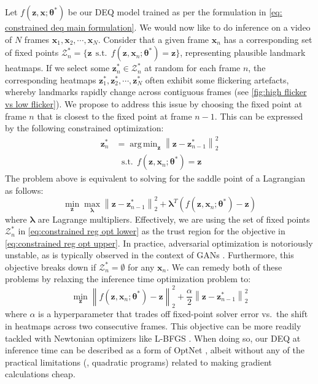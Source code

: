 \documentclass[10pt,twocolumn,letterpaper]{article}
\newcommand\norm[1]{\left\lVert#1\right\rVert}
\def\vtheta{{\bm{\theta}}}
\def\vlambda{{\bm{\lambda}}}
\def\vx{{\bm{x}}}
\def\vz{{\bm{z}}}
\DeclareMathOperator*{\argmin}{arg\,min}
\begin{document}
Let $f(\vz,\vx;\vtheta^*)$ be our DEQ model trained as per the formulation in \cref{eq: constrained deq main formulation}. We would now like to do inference on a video of $N$ frames $\vx_1, \vx_2, \cdots, \vx_N$. Consider that a given frame $\vx_n$ has a corresponding set of fixed points $\mathcal{Z}^*_n = \{ \vz ~~ \text{s.t.} ~~ f(\vz, \vx_n; \vtheta^*) = \vz \}$, representing plausible landmark heatmaps. If we select some $\vz_n^* \in \mathcal{Z}^*_n$ at random for each frame $n$, the corresponding heatmaps $\vz^*_1, \vz^*_2, \cdots, \vz^*_N$ often exhibit some flickering artefacts, whereby landmarks rapidly change across contiguous frames (see \cref{fig:high flicker vs low flicker}). We propose to address this issue by choosing the fixed point at frame $n$ that is closest to the fixed point at frame $n-1$. This can be expressed by the following constrained optimization:\begin{subequations}
\begin{align}
\vz^*_n &= \argmin_{\vz} \norm{\vz - \vz^*_{n-1}}_2^2 \label{eq:constrained reg opt upper} \\
& ~~~ \text{s.t.} ~~ f(\vz, \vx_n; \vtheta^*) = \vz \label{eq:constrained reg opt lower}
\end{align}
\end{subequations}
The problem above is equivalent to solving for the saddle point of a Lagrangian as follows:
\begin{equation}
    \min_{\vz} \max_{\vlambda} \norm{\vz - \vz^*_{n-1}}_2^2 + \vlambda^T (f(\vz, \vx_n; \vtheta^*) - \vz)
\end{equation}
where $\vlambda$ are Lagrange multipliers. Effectively, we are using the set of fixed points $\mathcal{Z}^*_n$ in \cref{eq:constrained reg opt lower} as the trust region for the objective in \cref{eq:constrained reg opt upper}. In practice, adversarial optimization is notoriously unstable, as is typically observed in the context of GANs \cite{Goodfellow2014GAN, Arjovsky2014WassersteinGANs, Srivastava2017VeeGAN}. Furthermore, this objective breaks down if $\mathcal{Z}^*_n = \emptyset$ for any $\vx_n$. We can remedy both of these problems by relaxing the inference time optimization problem to:
\begin{equation}
\min_{\vz} \norm{f(\vz, \vx_n; \vtheta^*) - \vz}_2^2 + \frac{\alpha}{2} \norm{\vz - \vz^*_{n-1}}_2^2
\label{eq: relaxed RwR minimization}
\end{equation}
where $\alpha$ is a hyperparameter that trades off fixed-point solver error vs.\ the shift in heatmaps across two consecutive frames. This objective can be more readily tackled with Newtonian optimizers like L-BFGS \cite{Liu1989LBFGS}. When doing so, our DEQ at inference time can be described as a form of OptNet \cite{Amos2017Optnet}, albeit without any of the practical limitations (\eg, quadratic programs) related to making gradient calculations cheap. 
\end{document}
